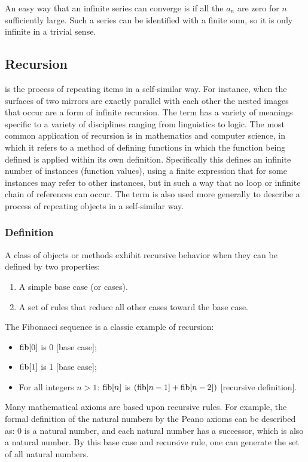 An easy way that an infinite series can converge is if all the $a_n$ are zero for $n$ sufficiently large. Such a series can be identified with a finite sum, so it is only infinite in a trivial sense.


\subsection{Recursion}
 is the process of repeating items in a self-similar way. For instance, when the surfaces of two mirrors are exactly parallel with each other the nested images that occur are a form of infinite recursion. The term has a variety of meanings specific to a variety of disciplines ranging from linguistics to logic. The most common application of recursion is in mathematics and computer science, in which it refers to a method of defining functions in which the function being defined is applied within its own definition. Specifically this defines an infinite number of instances (function values), using a finite expression that for some instances may refer to other instances, but in such a way that no loop or infinite chain of references can occur. The term is also used more generally to describe a process of repeating objects in a self-similar way.


\subsubsection{Definition}
A class of objects or methods exhibit recursive behavior when they can be defined by two properties:
\begin{enumerate}
\item A simple base case (or cases).
\item A set of rules that reduce all other cases toward the base case.
\end{enumerate} 

The Fibonacci sequence is a classic example of recursion:
\begin{itemize}
\item $\operatorname{fib}\!\left[{0}\right]$ is 0 [base case];
\item $\operatorname{fib}\!\left[{1}\right]$ is 1 [base case];
\item For all integers $n > 1$: $\operatorname{fib}\!\left[{n}\right]$ is $(\operatorname{fib}\!\left[{n-1}\right] + \operatorname{fib}\!\left[{n-2}\right])$ [recursive definition].
\end{itemize}

Many mathematical axioms are based upon recursive rules. For example, the formal definition of the natural numbers by the Peano axioms can be described as: 0 is a natural number, and each natural number has a successor, which is also a natural number. By this base case and recursive rule, one can generate the set of all natural numbers.

